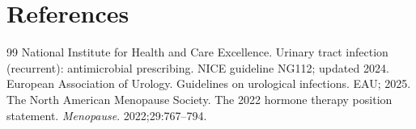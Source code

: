 \section*{References}
\begin{thebibliography}{99}
 National Institute for Health and Care Excellence. Urinary tract infection (recurrent): antimicrobial prescribing. NICE guideline NG112; updated 2024.
 European Association of Urology. Guidelines on urological infections. EAU; 2025.
 The North American Menopause Society. The 2022 hormone therapy position statement. \textit{Menopause}. 2022;29:767--794.
\end{thebibliography}
